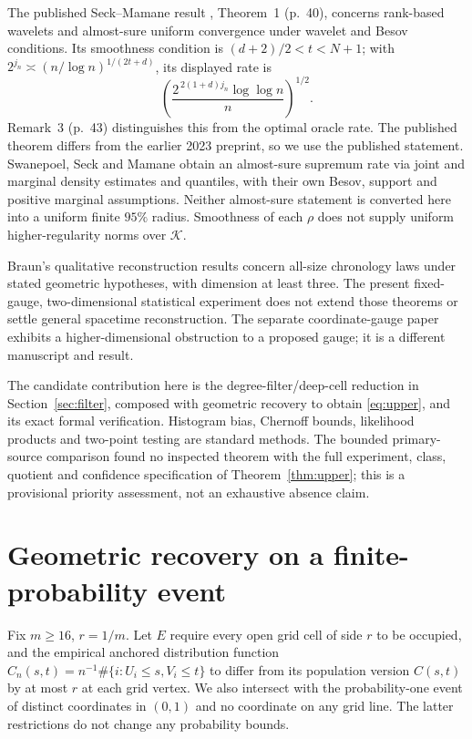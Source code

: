 \documentclass[11pt]{article}
\theoremstyle{remark}
\newcommand{\K}{\mathcal K}
\begin{document}
The published Seck--Mamane result \cite{SeckMamane}, Theorem~1
(p.~40), concerns rank-based wavelets and almost-sure uniform
convergence under wavelet and Besov conditions. Its smoothness
condition is $(d+2)/2<t<N+1$; with
$2^{j_n}\asymp(n/\log n)^{1/(2t+d)}$, its displayed rate is
\[
 \left(\frac{2^{\,2(1+d)j_n}\log\log n}{n}\right)^{1/2}.
\]
Remark~3 (p.~43) distinguishes this from the optimal oracle rate.
The published theorem differs from the earlier 2023 preprint, so we
use the published statement. Swanepoel, Seck and Mamane \cite{Swanepoel}
obtain an almost-sure supremum rate via joint and marginal density
estimates and quantiles, with their own Besov, support and positive
marginal assumptions. Neither almost-sure statement is converted
here into a uniform finite $95\%$ radius. Smoothness of each $\rho$
does not supply uniform higher-regularity norms over $\K$.

Braun's qualitative reconstruction results \cite{Braun} concern
all-size chronology laws under stated geometric hypotheses, with
dimension at least three. The present fixed-gauge, two-dimensional
statistical experiment does not extend those theorems or settle
general spacetime reconstruction. The separate coordinate-gauge
paper \cite{Gauge} exhibits a higher-dimensional obstruction to a
proposed gauge; it is a different manuscript and result.

The candidate contribution here is the degree-filter/deep-cell
reduction in Section~\ref{sec:filter}, composed with geometric
recovery to obtain \eqref{eq:upper}, and its exact formal verification.
Histogram bias, Chernoff bounds, likelihood products and two-point
testing are standard methods. The bounded primary-source comparison
found no inspected theorem with the full experiment, class, quotient
and confidence specification of Theorem~\ref{thm:upper}; this is a
provisional priority assessment, not an exhaustive absence claim.

\section{Geometric recovery on a finite-probability event}
\label{sec:geometry}
Fix $m\ge16$, $r=1/m$. Let $E$ require every open grid cell of side $r$
to be occupied, and the empirical anchored distribution function
$C_n(s,t)=n^{-1}\#\{i:U_i\le s,V_i\le t\}$ to differ from its population
version $C(s,t)$ by at most $r$ at each grid vertex.
We also intersect with the probability-one event of distinct
coordinates in $(0,1)$ and no coordinate on any grid line.
The latter restrictions do not change any probability bounds.
\end{document}
